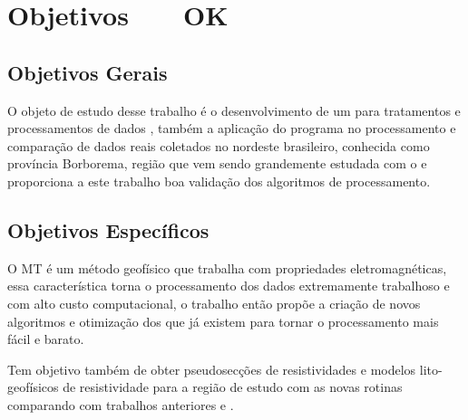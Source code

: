 
\chapter{Objetivos \, \,\,\,\,\, OK}
\label{cap-objetivos}

\section{Objetivos Gerais}
\label{cap-objetivos gerais}

    
    O objeto de estudo desse trabalho é o desenvolvimento de um  para tratamentos e processamentos de dados \MT, também a aplicação do programa no processamento e comparação de dados reais coletados no nordeste brasileiro, conhecida como província Borborema, região que vem sendo grandemente estudada com o \MT e proporciona a este trabalho boa validação dos algoritmos de processamento.   

\section{Objetivos Específicos}
\label{cap-objetivos especificos}

    O MT é um método geofísico que trabalha com propriedades eletromagnéticas, essa característica torna o processamento dos dados extremamente trabalhoso e com alto custo computacional, o trabalho então propõe a criação de novos algoritmos e otimização dos que já existem para tornar o processamento mais fácil e barato.
    
    Tem objetivo também de obter pseudosecções de resistividades e modelos lito-geofísicos de resistividade para a região de estudo com as novas rotinas comparando com trabalhos anteriores \cite{tese_andrea} e \cite{alane}.
